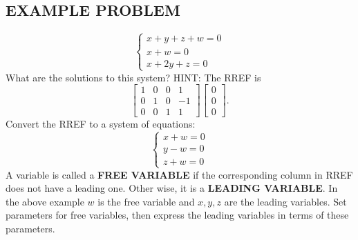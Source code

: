 \documentclass[letterpaper]{report}
\begin{document}
\subsection{EXAMPLE PROBLEM}%
\label{sub:EXAMPLE PROBLEM}
\begin{equation}
    \begin{cases}
        x + y + z + w = 0 \\
        x + w = 0 \\
        x + 2y + z  = 0 
    \end{cases}
\end{equation}
What are the solutions to this system? 
HINT: The RREF is 
\[
\begin{bmatrix} 
    1 & 0 & 0 & 1 \\
    0 & 1 & 0 & -1 \\
    0 & 0 & 1 & 1 
\end{bmatrix} 
\begin{bmatrix} 
0 \\ 0 \\ 0
\end{bmatrix} 
.\] 
Convert the RREF to a system of equations: 
\begin{equation}
    \begin{cases}
        x + w = 0 \\
        y - w = 0 \\
        z + w = 0 
    \end{cases}
\end{equation}
A variable is called a \textbf{FREE VARIABLE} if the corresponding column in RREF does not have a leading one. Other wise, it is a \textbf{LEADING VARIABLE}. In the above example $w$ is the free variable and $x,y,z$ are the leading variables. Set parameters for free variables, then express the leading variables in terms of these parameters. 
\end{document}

